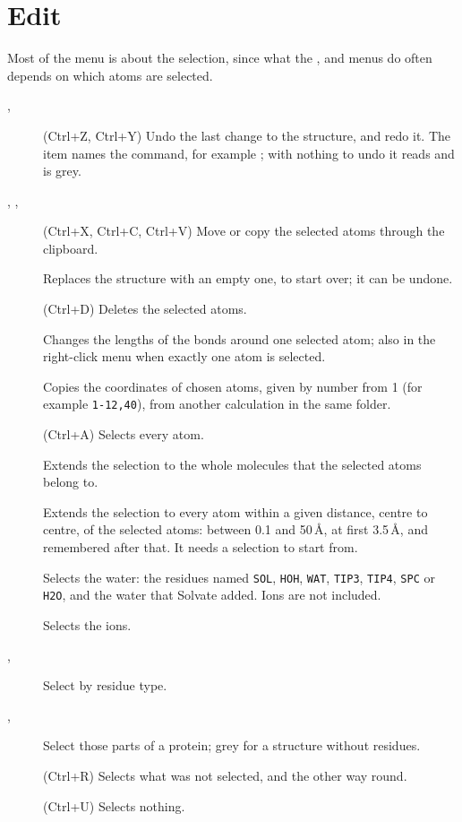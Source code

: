 \section{Edit}
Most of the  menu is about the selection, since what the ,  and  menus do often depends on which atoms are selected.
\begin{description}
	\item[, ] (\textsf{Ctrl+Z}, \textsf{Ctrl+Y}) Undo the last change to the structure, and redo it. The item names the command, for example ; with nothing to undo it reads  and is grey.
	\item[, , ] (\textsf{Ctrl+X}, \textsf{Ctrl+C}, \textsf{Ctrl+V}) Move or copy the selected atoms through the clipboard.
	\item[] Replaces the structure with an empty one, to start over; it can be undone.
	\item[] (\textsf{Ctrl+D}) Deletes the selected atoms.
	\item[] Changes the lengths of the bonds around one selected atom; also in the right-click menu when exactly one atom is selected.
	\item[] Copies the coordinates of chosen atoms, given by number from 1 (for example \texttt{1-12,40}), from another calculation in the same folder.
	\item[] (\textsf{Ctrl+A}) Selects every atom.
	\item[] Extends the selection to the whole molecules that the selected atoms belong to.
	\item[] Extends the selection to every atom within a given distance, centre to centre, of the selected atoms: between 0.1 and 50\,\AA, at first 3.5\,\AA, and remembered after that. It needs a selection to start from.
	\item[] Selects the water: the residues named \texttt{SOL}, \texttt{HOH}, \texttt{WAT}, \texttt{TIP3}, \texttt{TIP4}, \texttt{SPC} or \texttt{H2O}, and the water that Solvate added. Ions are not included.
	\item[] Selects the ions.
	\item[, ] Select by residue type.
	\item[, ] Select those parts of a protein; grey for a structure without residues.
	\item[] (\textsf{Ctrl+R}) Selects what was not selected, and the other way round.
	\item[] (\textsf{Ctrl+U}) Selects nothing.
\end{description}

